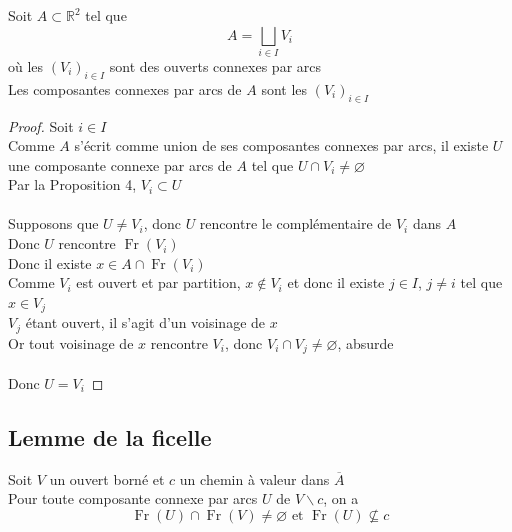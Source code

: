 \documentclass{article}
\begin{document}
\begin{flushleft}
\begin{tcolorbox}[colback = purple!20!white, colframe = purple!60!white, title = Proposition 5]
    Soit $A \subset \mathbb{R}^2$ tel que
    \[ A = \bigsqcup_{i \in I} V_i \]
    où les $(V_i)_{i \in I}$ sont des ouverts connexes par arcs\\
    Les composantes connexes par arcs de $A$ sont les $(V_i)_{i \in I}$
\end{tcolorbox}

\begin{proof}
    Soit $i \in I$\\
    Comme $A$ s'écrit comme union de ses composantes connexes par arcs, il existe $U$ une composante connexe par arcs de $A$
    tel que $U \cap V_i \neq \varnothing$\\
    Par la Proposition 4, $V_i \subset U$
    \\~\\
    Supposons que $U \neq V_i$, donc $U$ rencontre le complémentaire de $V_i$ dans $A$\\
    Donc $U$ rencontre $\operatorname{Fr}(V_i)$\\
    Donc il existe $x \in A \cap \operatorname{Fr}(V_i)$\\
    Comme $V_i$ est ouvert et par partition, $x \notin V_i$ et donc il existe $j \in I$, $j \neq i$ tel que
    $x \in V_j$\\
    $V_j$ étant ouvert, il s'agit d'un voisinage de $x$\\
    Or tout voisinage de $x$ rencontre $V_i$, donc $V_i \cap V_j \neq \varnothing$, absurde
    \\~\\
    Donc $U = V_i$
\end{proof}

\subsection{Lemme de la ficelle}


\begin{tcolorbox}[colback = purple!20!white, colframe = purple!60!white, title = Lemme]
    Soit $V$ un ouvert borné et $c$ un chemin à valeur dans $\overline{A}$\\
    Pour toute composante connexe par arcs $U$ de $V \backslash c$, on a
    \[ \operatorname{Fr}(U) \cap \operatorname{Fr}(V) \neq \varnothing \text{ et } \operatorname{Fr}(U) \nsubseteq c\]
\end{tcolorbox}


\end{flushleft}
\end{document}
